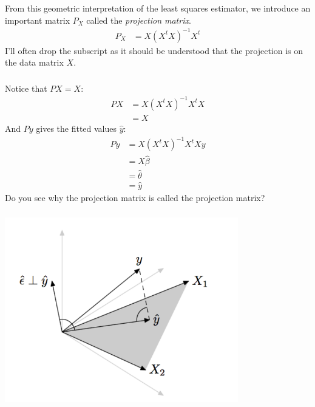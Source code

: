 \begin{frame}[fragile] \frametitle{}

From this geometric interpretation of the least squares estimator,
we introduce an important matrix $P_X$ called the {\it projection matrix}.
\begin{align*}
P_X &= X (X^t X)^{-1} X^t
\end{align*}
I'll often drop the subscript as it should be understood that the
projection is on the data matrix $X$.

\end{frame}

\begin{frame}[fragile] \frametitle{}

Notice that $PX=X$:
\begin{align*}
P X &= X (X^t X)^{-1} X^t X \\
&= X
\end{align*}
\pause And $Py$ gives the fitted values $\widehat{y}$:
\begin{align*}
P y &= X (X^t X)^{-1} X^t X y \\
&= X \widehat{\beta} \\
&= \widehat{\theta} \\
&= \widehat{y}
\end{align*}
Do you see why the projection matrix is called the projection
matrix? \pause

\end{frame}

\begin{frame}[fragile] \frametitle{}

\begin{center}
\includegraphics[width=4in]{img/olsGeom.pdf}
\end{center}

\end{frame}

